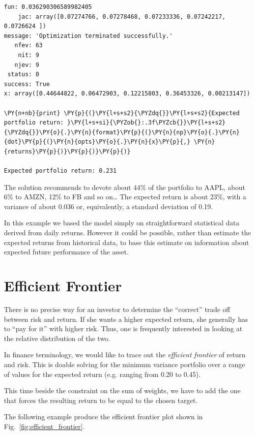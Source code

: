 \begin{codebox}
\begin{Verbatim}[commandchars=\\\{\}]
    fun: 0.036290306589982405
    jac: array([0.07274766, 0.07278468, 0.07233336, 0.07242217, 0.0726624 ])
message: 'Optimization terminated successfully.'
   nfev: 63
    nit: 9
   njev: 9
 status: 0
success: True
x: array([0.44644822, 0.06472903, 0.12215803, 0.36453326, 0.00213147])

\PY{n+nb}{print} \PY{p}{(}\PY{l+s+s2}{\PYZdq{}}\PY{l+s+s2}{Expected portfolio return: }\PY{l+s+si}{\PYZob{}:.3f\PYZcb{}}\PY{l+s+s2}{\PYZdq{}}\PY{o}{.}\PY{n}{format}\PY{p}{(}\PY{n}{np}\PY{o}{.}\PY{n}{dot}\PY{p}{(}\PY{n}{opts}\PY{o}{.}\PY{n}{x}\PY{p}{,} \PY{n}{returns}\PY{p}{)}\PY{p}{)}\PY{p}{)}

Expected portfolio return: 0.231
\end{Verbatim}
\end{codebox}

The solution recommends to devote about 44\% of the portfolio to AAPL,
about 6\% to AMZN, 12\% to FB and so on\ldots 
The expected return is
about 23\%, with a variance of about 0.036 or, equivalently, a standard deviation of 0.19.

In this example we based the model simply on straightforward statistical
data derived from daily returns. However it could be possible, rather
than estimate the expected returns from historical data,
to base this estimate on information about
expected future performance of the asset.

\section{Efficient Frontier}\label{efficient-frontier}
There is no precise way for an investor to determine the “correct” trade off between risk and return. If she wants a higher expected return, she generally has to “pay for it” with higher risk. Thus, one is frequently interested in looking at the relative distribution of the two.

In finance terminology, we would like to trace out the \emph{efficient frontier} of return and risk. This is doable solving for the minimum variance portfolio over a range of values for the expected return (e.g. ranging from 0.20 to 0.45).

This time beside the constraint on the sum of weights, we have to add the one that forces the resulting return to be equal to the chosen target.

The following example produce the efficient frontier plot shown in Fig.~\ref{fig:efficient_frontier}.

